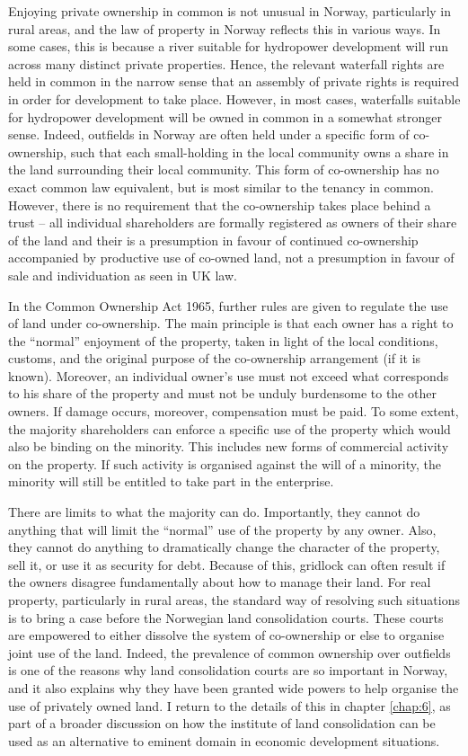 Enjoying private ownership in common is not unusual in Norway, particularly in rural areas, and the law of property in Norway reflects this in various ways. In some cases, this is because a river suitable for hydropower development will run across many distinct private properties. Hence, the relevant waterfall rights are held in common in the narrow sense that an assembly of private rights is required in order for development to take place. However, in most cases, waterfalls suitable for hydropower development will be owned in common in a somewhat stronger sense. Indeed, outfields in Norway are often held under a specific form of co-ownership, such that each small-holding in the local community owns a share in the land surrounding their local community. This form of co-ownership has no exact common law equivalent, but is most similar to the tenancy in common. However, there is no requirement that the co-ownership takes place behind a trust -- all individual shareholders are formally registered as owners of their share of the land and their is a presumption in favour of continued co-ownership accompanied by productive use of co-owned land, not a presumption in favour of sale and individuation as seen in UK law.

In the Common Ownership Act 1965, further rules are given to regulate the use of land under co-ownership. The main principle is that each owner has a right to the ``normal'' enjoyment of the property, taken in light of the local conditions, customs, and the original purpose of the co-ownership arrangement (if it is known). Moreover, an individual owner's use must not exceed what corresponds to his share of the property and must not be unduly burdensome to the other owners. If damage occurs, moreover, compensation must be paid. To some extent, the majority shareholders can enforce a specific use of the property which would also be binding on the minority. This includes new forms of commercial activity on the property. If such activity is organised against the will of a minority, the minority will still be entitled to take part in the enterprise. 

There are limits to what the majority can do. Importantly, they cannot do anything that will limit the ``normal'' use of the property by any owner. Also, they cannot do anything to dramatically change the character of the property, sell it, or use it as security for debt. Because of this, gridlock can often result if the owners disagree fundamentally about how to manage their land. For real property, particularly in rural areas, the standard way of resolving such situations is to bring a case before the Norwegian land consolidation courts. These courts are empowered to either dissolve the system of co-ownership or else to organise joint use of the land. Indeed, the prevalence of common ownership over outfields is one of the reasons why land consolidation courts are so important in Norway, and it also explains why they have been granted wide powers to help organise the use of privately owned land. I return to the details of this in chapter \ref{chap:6}, as part of a broader discussion on how the institute of land consolidation can be used as an alternative to eminent domain in economic development situations.

